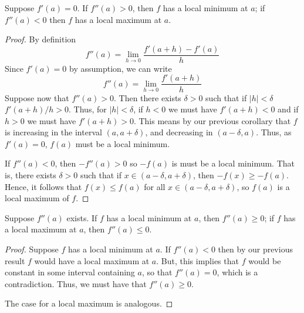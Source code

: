 \documentclass[12pt, a4paper, oneside, openright, titlepage]{book}
\begin{document}
\begin{thm}
    Suppose $f'(a) = 0$. If $f''(a) > 0$, then $f$ has a local minimum at $a$; if $f''(a) < 0$ then $f$ has a local maximum at $a$.
\end{thm}
\begin{proof}
    By definition \begin{equation*}
        f''(a) = \lim\limits_{h\rightarrow 0} \frac{f'(a+h) - f'(a)}{h}
    \end{equation*}
    Since $f'(a) = 0$ by assumption, we can write \begin{equation*}
        f''(a) = \lim\limits_{h\rightarrow 0}\frac{f'(a+h)}{h}
    \end{equation*}
    Suppose now that $f''(a) > 0$. Then there exists $\delta >0$ such that if $|h| < \delta$ $f'(a+h)/h > 0$. Thus, for $|h| < \delta$, if $h < 0$ we must have $f'(a+h) < 0$ and if $h > 0$ we must have $f'(a+h) > 0$. This means by our previous corollary that $f$ is increasing in the interval $(a,a+\delta)$, and decreasing in $(a-\delta, a)$. Thus, as $f'(a) = 0$, $f(a)$ must be a local minimum.

    If $f''(a) < 0$, then $-f''(a) > 0$ so $-f(a)$ is must be a local minimum. That is, there exists $\delta > 0$ such that if $x \in (a - \delta, a + \delta)$, then $-f(x) \geq -f(a)$. Hence, it follows that $f(x) \leq f(a)$ for all $x \in (a-\delta,a+\delta)$, so $f(a)$ is a local maximum of $f$.
\end{proof}


\begin{thm}
    Suppose $f''(a)$ exists. If $f$ has a local minimum at $a$, then $f''(a) \geq 0$; if $f$ has a local maximum at $a$, then $f''(a) \leq 0$.
\end{thm}
\begin{proof}
    Suppose $f$ has a local minimum at $a$. If $f''(a) < 0$ then by our previous result $f$ would have a local maximum at $a$. But, this implies that $f$ would be constant in some interval containing $a$, so that $f''(a) = 0$, which is a contradiction. Thus, we must have that $f''(a) \geq 0$.

    The case for a local maximum is analogous.
\end{proof}
\end{document}
